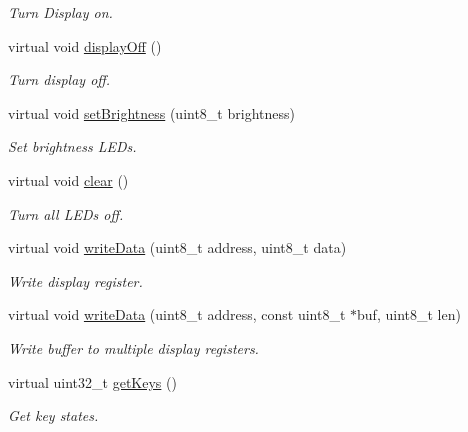 \begin{DoxyCompactItemize}
\begin{DoxyCompactList}\small\item\em Turn Display on. \end{DoxyCompactList}\item 
virtual void \hyperlink{class_t_m1638_a9b33cb60687956656fb84174d71c57d6}{display\+Off} ()\hypertarget{class_t_m1638_a9b33cb60687956656fb84174d71c57d6}{}\label{class_t_m1638_a9b33cb60687956656fb84174d71c57d6}

\begin{DoxyCompactList}\small\item\em Turn display off. \end{DoxyCompactList}\item 
virtual void \hyperlink{class_t_m1638_a8bb2b1073f8f4f43258fc8cabb8eb8a2}{set\+Brightness} (uint8\+\_\+t brightness)
\begin{DoxyCompactList}\small\item\em Set brightness L\+ED\textquotesingle{}s. \end{DoxyCompactList}\item 
virtual void \hyperlink{class_t_m1638_ad5e50b9e78c006e9a91782fbb4e4d636}{clear} ()\hypertarget{class_t_m1638_ad5e50b9e78c006e9a91782fbb4e4d636}{}\label{class_t_m1638_ad5e50b9e78c006e9a91782fbb4e4d636}

\begin{DoxyCompactList}\small\item\em Turn all L\+ED\textquotesingle{}s off. \end{DoxyCompactList}\item 
virtual void \hyperlink{class_t_m1638_a34dc8c06e3a863260aab1c61ddae875a}{write\+Data} (uint8\+\_\+t address, uint8\+\_\+t data)
\begin{DoxyCompactList}\small\item\em Write display register. \end{DoxyCompactList}\item 
virtual void \hyperlink{class_t_m1638_acff71225b60887fe9ab8c1aac2b45bf5}{write\+Data} (uint8\+\_\+t address, const uint8\+\_\+t $\ast$buf, uint8\+\_\+t len)
\begin{DoxyCompactList}\small\item\em Write buffer to multiple display registers. \end{DoxyCompactList}\item 
virtual uint32\+\_\+t \hyperlink{class_t_m1638_a4a0058c130c0368a2651c7dbc5eaa5a0}{get\+Keys} ()
\begin{DoxyCompactList}\small\item\em Get key states. \end{DoxyCompactList}\end{DoxyCompactItemize}
